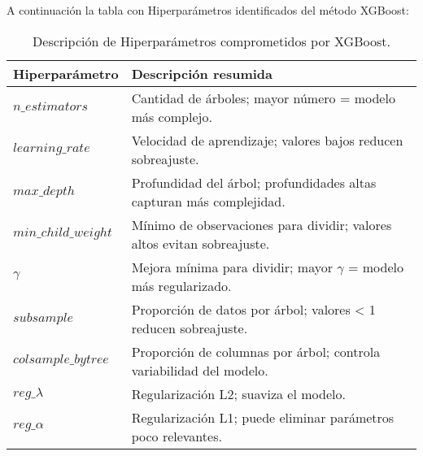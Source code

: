 A continuación la tabla con Hiperparámetros identificados del método XGBoost: 


\begin{table}[H] \centering \small 
\caption{Descripción de Hiperparámetros comprometidos por XGBoost.} \label{tab:hiperparámetros} 
\begin{tabular}{ll} \hline 
\textbf{Hiperparámetro} & \textbf{Descripción resumida} \\ \hline $n\_estimators$ & Cantidad de árboles; mayor número = modelo más complejo. \\ $learning\_rate$ & Velocidad de aprendizaje; valores bajos reducen sobreajuste. \\ $max\_depth$ & Profundidad del árbol; profundidades altas capturan más complejidad. \\ $min\_child\_weight$ & Mínimo de observaciones para dividir; valores altos evitan sobreajuste. \\ $\gamma$ & Mejora mínima para dividir; mayor $\gamma$ = modelo más regularizado. \\ $subsample$ & Proporción de datos por árbol; valores < 1 reducen sobreajuste. \\ $colsample\_bytree$ & Proporción de columnas por árbol; controla variabilidad del modelo. \\ $reg\_\lambda$ & Regularización L2; suaviza el modelo. \\ $reg\_\alpha$ & Regularización L1; puede eliminar parámetros poco relevantes. \\ \hline \end{tabular} \end{table}






